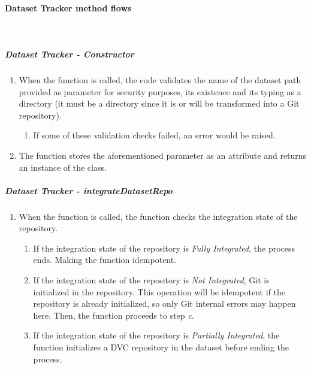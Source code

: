 \paragraph{Dataset Tracker method flows} \mbox{}\\

\subparagraph{Dataset Tracker - Constructor}

\begin{enumerate}
    \item When the function is called, the code validates the name of the dataset path provided as parameter for security purposes, its existence and its typing as a directory
    (it must be a directory since it is or will be transformed into a Git repository).

    \begin{enumerate}
        \item If some of these validation checks failed, an error would be raised.
    \end{enumerate}

    \item The function stores the aforementioned parameter as an attribute and returns an instance of the class. 
\end{enumerate}

\subparagraph{Dataset Tracker - integrateDatasetRepo}

\begin{enumerate}
    \item When the function is called, the function checks the integration state of the repository.
    \begin{enumerate}
        \item If the integration state of the repository is \emph{Fully Integrated}, the process ends. Making the function idempotent.
        
        \item If the integration state of the repository is \emph{Not Integrated}, Git is initialized in the repository. This operation will be idempotent if the repository is already initialized, so only Git internal errors may happen here.
        Then, the function proceeds to step \emph{c}.

        \item If the integration state of the repository is \emph{Partially Integrated}, the function initializes a DVC repository in the dataset before ending the process.
    \end{enumerate}
\end{enumerate}

